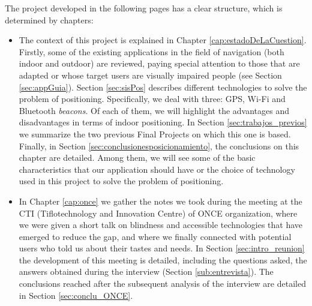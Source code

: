 The project developed in the following pages has a clear structure, which is determined by chapters:

\begin{itemize}
	
	\item The context of this project is explained in Chapter \ref{cap:estadoDeLaCuestion}. Firstly, some of the existing applications in the field of navigation (both indoor and outdoor) are reviewed, paying special attention to those that are adapted or whose target users are visually impaired people (see Section \ref{sec:appGuia}). Section \ref{sec:sisPos} describes different technologies to solve the problem of positioning. Specifically, we deal with three: GPS, Wi-Fi and Bluetooth \textit{beacons}. Of each of them, we will highlight the advantages and disadvantages in terms of indoor positioning. In Section \ref{sec:trabajos_previos} we summarize the two previous Final Projects on which this one is based. Finally, in Section \ref{sec:conclusionesposicionamiento}, the conclusions on this chapter are detailed. Among them, we will see some of the basic characteristics that our application should have or the choice of technology used in this project to solve the problem of positioning. 
	
	\item In Chapter \ref{cap:once} we gather the notes we took during the meeting at the CTI (Tiflotechnology and Innovation Centre) of ONCE organization, where we were given a short talk on blindness and accessible technologies that have emerged to reduce the gap, and where we finally connected with potential users who told us about their tastes and needs. In Section \ref{sec:intro_reunion} the development of this meeting is detailed, including the questions asked, the answers obtained during the interview (Section \ref{sub:entrevista}). The conclusions reached after the subsequent analysis of the interview are detailed in Section \ref{sec:conclu_ONCE}. 
	

\end{itemize}
